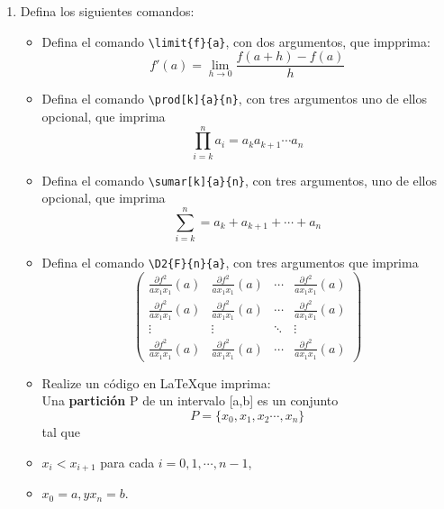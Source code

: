 \documentclass[12pt]{book}
\begin{document}
\begin{enumerate}
    \item Defina los siguientes comandos:
    \begin{itemize}
        \item Defina el comando \texttt{\textbackslash limit\{f\}\{a\}}, con dos argumentos, que impprima:
            \begin{equation*}
                f'(a) = \lim_{h \to 0}\frac{f(a+h)-f(a)}{h}
            \end{equation*}
        \item Defina el comando \texttt{\textbackslash prod[k]\{a\}\{n\}}, con tres argumentos uno de ellos opcional, que imprima 
        \begin{equation*}
            \prod_{i=k}^{n}a_{i}=a_{k}a_{k+1}\cdots a_{n} 
        \end{equation*}
        \item Defina el comando \texttt{\textbackslash sumar[k]\{a\}\{n\}}, con tres argumentos, uno de ellos opcional, que imprima
        \begin{equation*}
            \sum_{i=k}^{n}=a_{k}+a_{k+1}+\cdots+a_{n}
        \end{equation*}
        \item Defina el comando \texttt{\textbackslash D2\{F\}\{n\}\{a\}}, con tres argumentos que imprima
        \begin{equation*}
        \begin{pmatrix}
            \frac{\partial f^{2}}{ax_{1}x_{1}} (a) & \frac{\partial f^{2}}{ax_{1}x_{1}} (a) &  \cdots & \frac{\partial f^{2}}{ax_{1}x_{1}} (a)  \\
            \frac{\partial f^{2}}{ax_{1}x_{1}} (a) & \frac{\partial f^{2}}{ax_{1}x_{1}} (a)& \cdots & \frac{\partial f^{2}}{ax_{1}x_{1}} (a) \\ 
            \vdots & \vdots & \ddots & \vdots \\ 
            \frac{\partial f^{2}}{ax_{1}x_{1}} (a) & \frac{\partial f^{2}}{ax_{1}x_{1}} (a) & 
            \cdots & \frac{\partial f^{2}}{ax_{1}x_{1}} (a)
        \end{pmatrix}
    \end{equation*}
    \item Realize un código en \LaTeX que imprima: \\
    
     Una \textbf{partición} P de un intervalo [a,b] es un conjunto 
    \begin{equation}
    P = \{x_{0},x_{1},x_{2} \cdots, x_{n}\}
    \end{equation}
    tal que

    \newpage
    \item $x_{i}<x_{i+1}$ para cada $i=0,1, \cdots, n-1$,
    \item $x_{0}=a, y x_{n}=b.$
    \end{itemize}
\end{enumerate}
\end{document}
